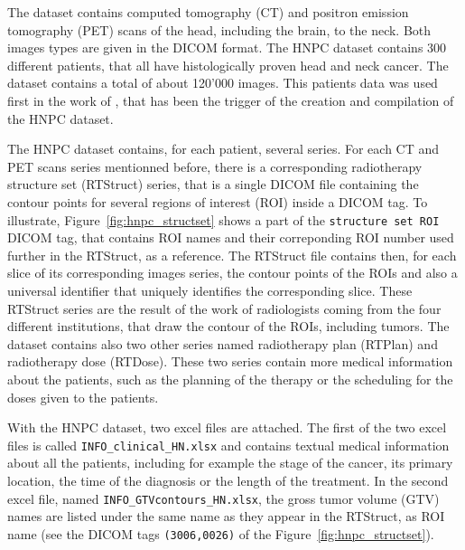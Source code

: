 The dataset contains computed tomography (CT) and positron emission tomography (PET) scans of the head, including the brain, to the neck. Both images types are given in the DICOM format. The HNPC dataset contains 300 different patients, that all have histologically proven head and neck cancer. The dataset contains a total of about 120'000 images. This patients data was used first in the work of \citet{vallieres_radiomics_2017}, that has been the trigger of the creation and compilation of the HNPC dataset.

The HNPC dataset contains, for each patient, several series. For each CT and PET scans series mentionned before, there is a corresponding radiotherapy structure set (RTStruct) series, that is a single DICOM file containing the contour points for several regions of interest (ROI) inside a DICOM tag. To illustrate, Figure~\ref{fig:hnpc_structset} shows a part of the \texttt{structure set ROI} DICOM tag, that contains ROI names and their correponding ROI number used further in the RTStruct, as a reference. The RTStruct file contains then, for each slice of its corresponding images series, the contour points of the ROIs and also a universal identifier that uniquely identifies the corresponding slice. These RTStruct series are the result of the work of radiologists coming from the four different institutions, that draw the contour of the ROIs, including tumors. The dataset contains also two other series named radiotherapy plan (RTPlan) and radiotherapy dose (RTDose). These two series contain more medical information about the patients, such as the planning of the therapy or the scheduling for the doses given to the patients.

With the HNPC dataset, two excel files are attached. The first of the two excel files is called \texttt{INFO\_clinical\_HN.xlsx} and contains textual medical information about all the patients, including for example the stage of the cancer, its primary location, the time of the diagnosis or the length of the treatment. In the second excel file, named \texttt{INFO\_GTVcontours\_HN.xlsx}, the gross tumor volume (GTV) names are listed under the same name as they appear in the RTStruct, as ROI name (see the DICOM tags \texttt{(3006,0026)} of the Figure~\ref{fig:hnpc_structset}).

